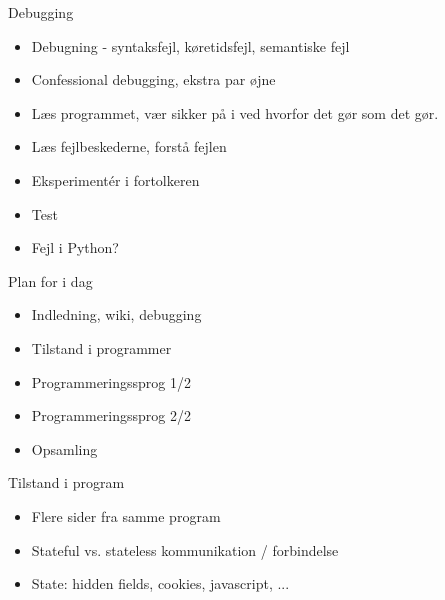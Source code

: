 \documentclass[a4paper,landscape]{slides}
\begin{document}
\begin{slide}
	\begin{center} {\large 
           Debugging
	} \end{center}
	\begin{itemize} \addtolength{\itemsep}{-\baselineskip}
            \item Debugning - syntaksfejl, køretidsfejl, semantiske fejl
            \item Confessional debugging, ekstra par øjne
            \item Læs programmet, vær sikker på i ved hvorfor det gør som det gør.
            \item Læs fejlbeskederne, forstå fejlen
            \item Eksperimentér i fortolkeren
            \item Test
            \item Fejl i Python?
	\end{itemize}
\end{slide}
\begin{slide}
	\begin{center} {\large 
            Plan for i dag
	} \end{center}
	\begin{itemize} \addtolength{\itemsep}{-\baselineskip}
            \item Indledning, wiki, debugging
            \item Tilstand i programmer
            \item Programmeringssprog 1/2
            \item Programmeringssprog 2/2
            \item Opsamling
	\end{itemize}
\end{slide}

\begin{slide}
	\begin{center} {\large 
            Tilstand i program
	} \end{center}
	\begin{itemize} \addtolength{\itemsep}{-\baselineskip}
            \item Flere sider fra samme program
            \item Stateful vs. stateless kommunikation / forbindelse
            \item State: hidden fields, cookies, javascript, ...
	\end{itemize}
\end{slide}
\end{document}
